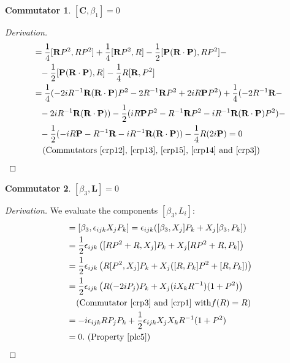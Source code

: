 \documentclass[12pt,a4paper]{report}
\theoremstyle{definition}
\newtheorem{commutator}{Commutator}[section]
\newenvironment{derivation}
  {\renewcommand\qedsymbol{$\square$}\begin{proof}[Derivation]}
  {\end{proof}}
\theoremstyle{remark}
\theoremstyle{remark}
\begin{document}
\begin{appendices}
\begin{commutator}\label{cbeta1.3}
$[\textbf{C},\beta_1]=0$
\end{commutator}
\begin{derivation}
\begin{align*}
[\textbf{C},\beta_1]&=\frac{1}{4}[\textbf{R}P^2,RP^2]+\frac{1}{4}[\textbf{R}P^2,R]-\frac{1}{2}[\textbf{P}(\textbf{R}\cdot\textbf{P}),RP^2]-\\
&\phantom{=}-\frac{1}{2}[\textbf{P}(\textbf{R}\cdot\textbf{P}),R]-\frac{1}{4}R[\textbf{R},P^2]\\
&=\frac{1}{4}(-2iR^{-1}\textbf{R}(\textbf{R}\cdot\textbf{P})P^2-2R^{-1}\textbf{R}P^2+2iR\textbf{P}P^2)+\frac{1}{4}(-2R^{-1}\textbf{R}-\\
&\phantom{=}-2iR^{-1}\textbf{R}(\textbf{R}\cdot\textbf{P}))-\frac{1}{2}(iR\textbf{P}P^2-R^{-1}\textbf{R}P^2-iR^{-1}\textbf{R}(\textbf{R}\cdot\textbf{P})P^2)-\\
&\phantom{=}-\frac{1}{2}(-iR\textbf{P}-R^{-1}\textbf{R}-iR^{-1}\textbf{R}(\textbf{R}\cdot\textbf{P}))-\frac{1}{4}R(2i\textbf{P})=0\\
&\phantom{=}\text{ (Commutators~\ref{crp12},~\ref{crp13},~\ref{crp15},~\ref{crp14} and~\ref{crp3})}
\end{align*}
\end{derivation}

\begin{commutator}\label{cbeta3.1}
$[\beta_3,\textbf{L}]=0$
\end{commutator}
\begin{derivation}We evaluate the components $[\beta_3,L_i]$:
\begin{align*}
[\beta_3,L_i]&=[\beta_3,\epsilon_{ijk}X_jP_k]=\epsilon_{ijk}([\beta_3,X_j]P_k+X_j[\beta_3,P_k])\\
&=\frac{1}{2}\epsilon_{ijk}\left([RP^2+R,X_j]P_k+X_j[RP^2+R,P_k]\right)\\
&=\frac{1}{2}\epsilon_{ijk}\left(R[P^2,X_j]P_k+X_j([R,P_k]P^2+[R,P_k])\right)\\
&=\frac{1}{2}\epsilon_{ijk}\left(R(-2iP_j)P_k+X_j(iX_kR^{-1})(1+P^2)\right)\\
&\phantom{=}\text{ (Commutator~\ref{crp3} and~\ref{crp1} with}f(R)=R)\\
&=-i\epsilon_{ijk}RP_jP_k+\frac{1}{2}\epsilon_{ijk}X_jX_kR^{-1}(1+P^2)\\
&=0. \text{ (Property~\ref{plc5})}
\end{align*}
\end{derivation}


\end{appendices}
\end{document}
